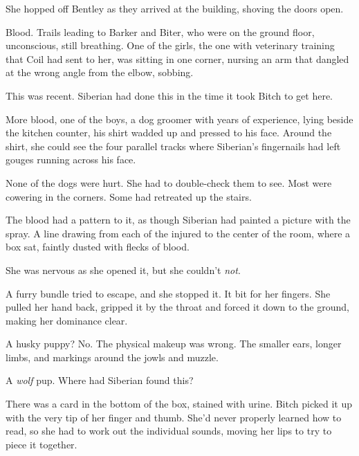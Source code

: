 She hopped off Bentley as they arrived at the building, shoving the doors open.



Blood.  Trails leading to Barker and Biter, who were on the ground floor, unconscious, still breathing.  One of the girls, the one with veterinary training that Coil had sent to her, was sitting in one corner, nursing an arm that dangled at the wrong angle from the elbow, sobbing.



This was recent.  Siberian had done this in the time it took Bitch to get here.



More blood, one of the boys, a dog groomer with years of experience, lying beside the kitchen counter, his shirt wadded up and pressed to his face.  Around the shirt, she could see the four parallel tracks where Siberian's fingernails had left gouges running across his face.



None of the dogs were hurt.  She had to double-check them to see.  Most were cowering in the corners.  Some had retreated up the stairs.



The blood had a pattern to it, as though Siberian had painted a picture with the spray.  A line drawing from each of the injured to the center of the room, where a box sat, faintly dusted with flecks of blood.



She was nervous as she opened it, but she couldn't \emph{not}.



A furry bundle tried to escape, and she stopped it.  It bit for her fingers.  She pulled her hand back, gripped it by the throat and forced it down to the ground, making her dominance clear.



A husky puppy?  No.  The physical makeup was wrong.  The smaller ears, longer limbs, and markings around the jowls and muzzle.



A \emph{wolf} pup. Where had Siberian found this?



There was a card in the bottom of the box, stained with urine.  Bitch picked it up with the very tip of her finger and thumb.  She'd never properly learned how to read, so she had to work out the individual sounds, moving her lips to try to piece it together.



